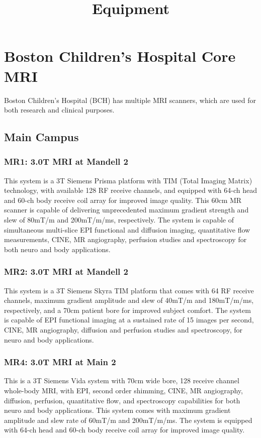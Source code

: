 \documentclass[11pt]{amsart}
\title{Equipment}
\author{}
\date{}
\begin{document}
\maketitle
\hypertarget{x-boston-children’s-hospital-core-mri}{\section*{Boston Children’s Hospital Core MRI}}
Boston Children’s Hospital (BCH) has multiple MRI scanners, which are used for both research and clinical purposes.


\hypertarget{x-main-campus}{\subsection*{Main Campus}}
\hypertarget{x-mr1:-3.0t-mri-at-mandell-2}{\subsubsection*{MR1: 3.0T MRI at Mandell 2}}
This system is a 3T Siemens Prisma platform with TIM (Total Imaging Matrix) technology, with available 128 RF receive channels, and equipped with 64-ch head and 60-ch body receive coil array for improved image quality. This 60cm MR scanner is capable of delivering unprecedented maximum gradient strength and slew of 80mT/m and 200mT/m/ms, respectively. The system is capable of simultaneous multi-slice EPI functional and diffusion imaging, quantitative flow measurements, CINE, MR angiography, perfusion studies and spectroscopy for both neuro and body applications.


\hypertarget{x-mr2:-3.0t-mri-at-mandell-2}{\subsubsection*{MR2: 3.0T MRI at Mandell 2}}
This system is a 3T Siemens Skyra TIM platform that comes with 64 RF receive channels, maximum gradient amplitude and slew of 40mT/m and 180mT/m/ms, respectively, and a 70cm patient bore for improved subject comfort. The system is capable of EPI functional imaging at a sustained rate of 15 images per second, CINE, MR angiography, diffusion and perfusion studies and spectroscopy, for neuro and body applications.


\hypertarget{x-mr4:-3.0t-mri-at-main-2}{\subsubsection*{MR4: 3.0T MRI at Main 2}}
This is a 3T Siemens Vida system with 70cm wide bore, 128 receive channel whole-body MRI, with EPI, second order shimming, CINE, MR angiography, diffusion, perfusion, quantitative flow, and spectroscopy capabilities for both neuro and body applications. This system comes with maximum gradient amplitude and slew rate of 60mT/m and 200mT/m/ms. The system is equipped with 64-ch head and 60-ch body receive coil array for improved image quality.
\end{document}
